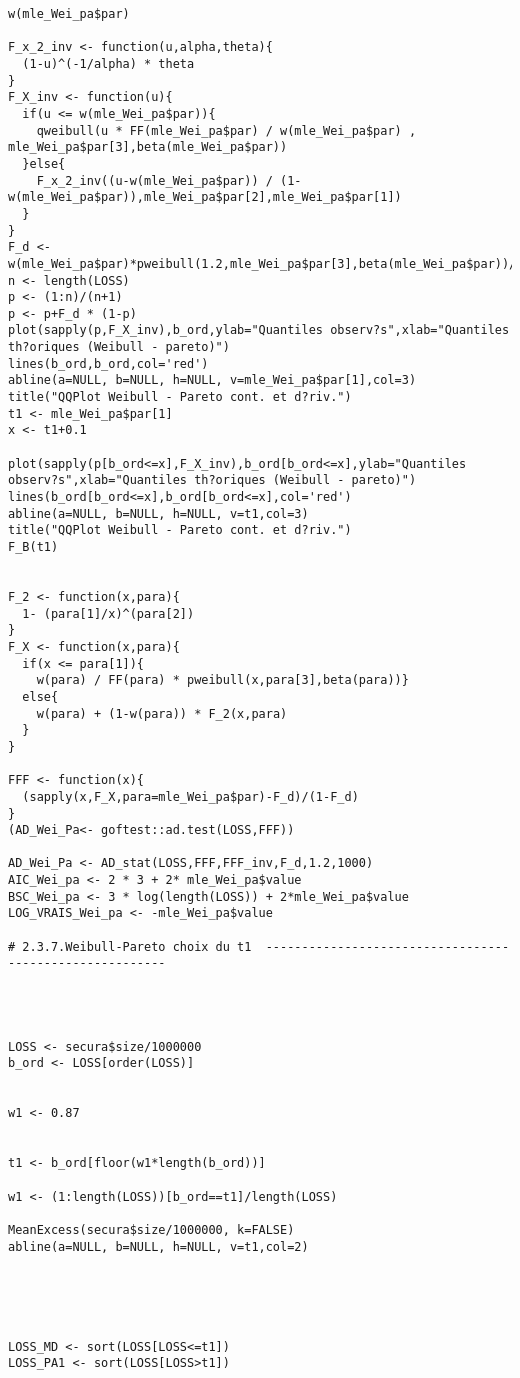 \begin{verbatim}
w(mle_Wei_pa$par)

F_x_2_inv <- function(u,alpha,theta){
  (1-u)^(-1/alpha) * theta
}
F_X_inv <- function(u){
  if(u <= w(mle_Wei_pa$par)){
    qweibull(u * FF(mle_Wei_pa$par) / w(mle_Wei_pa$par) , mle_Wei_pa$par[3],beta(mle_Wei_pa$par))
  }else{
    F_x_2_inv((u-w(mle_Wei_pa$par)) / (1-w(mle_Wei_pa$par)),mle_Wei_pa$par[2],mle_Wei_pa$par[1])
  }
}
F_d <- w(mle_Wei_pa$par)*pweibull(1.2,mle_Wei_pa$par[3],beta(mle_Wei_pa$par))/FF(mle_Wei_pa$par)
n <- length(LOSS)
p <- (1:n)/(n+1)
p <- p+F_d * (1-p)
plot(sapply(p,F_X_inv),b_ord,ylab="Quantiles observ?s",xlab="Quantiles th?oriques (Weibull - pareto)")
lines(b_ord,b_ord,col='red')
abline(a=NULL, b=NULL, h=NULL, v=mle_Wei_pa$par[1],col=3)
title("QQPlot Weibull - Pareto cont. et d?riv.")
t1 <- mle_Wei_pa$par[1]
x <- t1+0.1

plot(sapply(p[b_ord<=x],F_X_inv),b_ord[b_ord<=x],ylab="Quantiles observ?s",xlab="Quantiles th?oriques (Weibull - pareto)")
lines(b_ord[b_ord<=x],b_ord[b_ord<=x],col='red')
abline(a=NULL, b=NULL, h=NULL, v=t1,col=3)
title("QQPlot Weibull - Pareto cont. et d?riv.")
F_B(t1)


F_2 <- function(x,para){
  1- (para[1]/x)^(para[2])
}
F_X <- function(x,para){
  if(x <= para[1]){
    w(para) / FF(para) * pweibull(x,para[3],beta(para))}
  else{
    w(para) + (1-w(para)) * F_2(x,para)
  }
}

FFF <- function(x){
  (sapply(x,F_X,para=mle_Wei_pa$par)-F_d)/(1-F_d)
}
(AD_Wei_Pa<- goftest::ad.test(LOSS,FFF))

AD_Wei_Pa <- AD_stat(LOSS,FFF,FFF_inv,F_d,1.2,1000)
AIC_Wei_pa <- 2 * 3 + 2* mle_Wei_pa$value
BSC_Wei_pa <- 3 * log(length(LOSS)) + 2*mle_Wei_pa$value
LOG_VRAIS_Wei_pa <- -mle_Wei_pa$value

# 2.3.7.Weibull-Pareto choix du t1  --------------------------------------------------------




LOSS <- secura$size/1000000
b_ord <- LOSS[order(LOSS)]


w1 <- 0.87


t1 <- b_ord[floor(w1*length(b_ord))]

w1 <- (1:length(LOSS))[b_ord==t1]/length(LOSS)

MeanExcess(secura$size/1000000, k=FALSE)
abline(a=NULL, b=NULL, h=NULL, v=t1,col=2)





LOSS_MD <- sort(LOSS[LOSS<=t1])
LOSS_PA1 <- sort(LOSS[LOSS>t1])



\end{verbatim}
